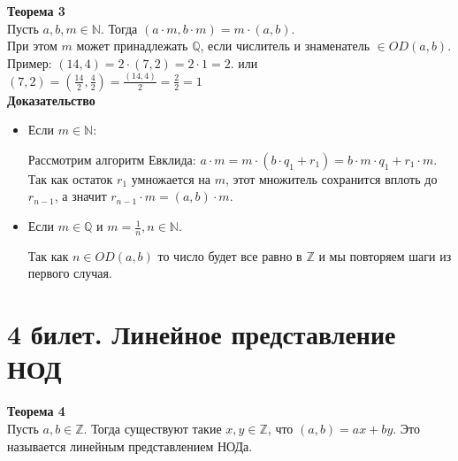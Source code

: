\documentclass[a4paper, 12pt]{article}
\begin{document}
\textbf{Теорема 3}\\
Пусть $a, b, m \in \mathbb{N}$. Тогда $(a \cdot m, b \cdot m) = m \cdot (a, b)$.\\

При этом $m$ может принадлежать $\mathbb{Q}$, если числитель и знаменатель $\in OD(a,b)$.\\

Пример: $(14,4) = 2 \cdot (7,2) = 2 \cdot 1 = 2.$ или $(7,2) = (\frac{14}{2},\frac{4}{2}) = \frac{(14,4)}{2} = \frac{2}{2} = 1$\\

\textbf{Доказательство}

\begin{itemize}

\item Если $m \in \mathbb{N}$: 

Рассмотрим алгоритм Евклида: $a \cdot m = m \cdot (b \cdot q_1 + r_1) = b \cdot m \cdot q_1 + r_1 \cdot m$. Так как остаток $r_1$ умножается на $m$, этот множитель сохранится вплоть до $r_{n-1}$, а значит $r_{n-1} \cdot m = (a,b) \cdot m$.

\item Если $m \in \mathbb{Q}$ и $m = \frac{1}{n}, n \in \mathbb{N}$.

Так как $n \in OD(a,b)$ то число будет все равно в $\mathbb{Z}$ и мы повторяем шаги из первого случая.

\end{itemize}

\section*{4 билет. Линейное представление НОД}

\textbf{Теорема 4}\\

Пусть $a, b \in \mathbb{Z}$. Тогда существуют такие $x, y \in \mathbb{Z}$, что $(a, b) = ax + by$.
Это называется линейным представлением НОДа.
\end{document}
